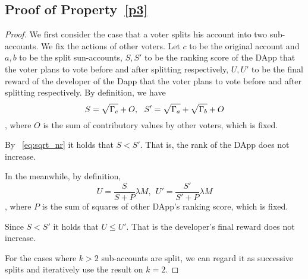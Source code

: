 \subsection{Proof of Property~\ref{p3}}
\begin{proof}
	We first consider the case that a voter splits his account into two sub-accounts. We fix the actions of other voters. Let $c$ to be the original account and $a,b$ to be the split sun-accounts, $S,S'$ to be the ranking score of the DApp that the voter plans to vote before and after splitting respectively, $U,U'$ to be the final reward of the developer of the Dapp that the voter plans to vote before and after splitting respectively. By definition, we have 
	$$S= \sqrt{\Gamma_c}+O,~~S'=\sqrt{\Gamma_a}+\sqrt{\Gamma_b}+O$$,
	where $O$ is the sum of contributory values by other voters, which is fixed. 
	
	By ~\ref{eq:sqrt_nr} it holds that $S < S'$. That is, the rank of the DApp does not increase. 
	
	In the meanwhile, by definition, 
	$$U = \frac{S}{S+P}\lambda M,~~U' = \frac{S'}{S'+P} \lambda M$$,
	where $P$ is the sum of squares of other DApp's ranking score, which is fixed. 
	
	Since $S < S'$ it holds that $U \leq U'$. That is the developer's final reward does not increase.
	
	For the cases where $k>2$ sub-accounts are split, we can regard it as successive splits and iteratively use the result on $k=2$. 
	
\end{proof}